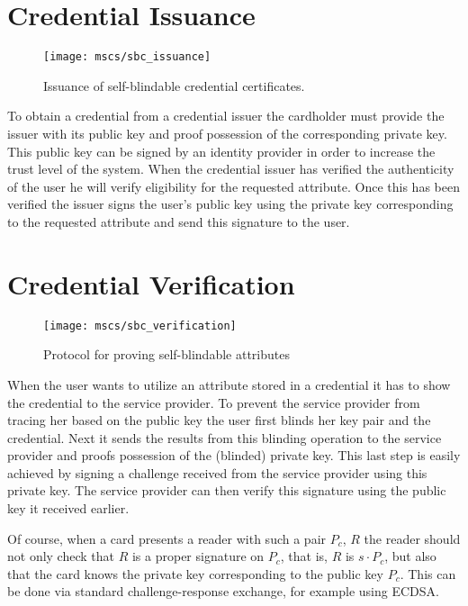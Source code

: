 
\section{Credential Issuance}

\begin{figure}
  \centering
  \texttt{[image: mscs/sbc\_issuance]}
  \caption{Issuance of self-blindable credential certificates.}\label{fig:SBC-issuance}
\end{figure}

To obtain a credential from a credential issuer the cardholder must provide the
issuer with its public key and proof possession of the corresponding private key.
This public key can be signed by an identity provider in order to increase the
trust level of the system. When the credential issuer has verified the
authenticity of the user he will verify eligibility for the requested attribute.
Once this has been verified the issuer signs the user's public key using the
private key corresponding to the requested attribute and send this signature to
the user.

\section{Credential Verification}

\begin{figure}
  \centering
  \texttt{[image: mscs/sbc\_verification]}
  \caption{Protocol for proving self-blindable attributes}\label{fig:textual_en}
\end{figure}

When the user wants to utilize an attribute stored in a credential it has to
show the credential to the service provider. To prevent the service provider
from tracing her based on the public key the user first blinds her key pair and
the credential. Next it sends the results from this blinding operation to the
service provider and proofs possession of the (blinded) private key. This last
step is easily achieved by signing a challenge received from the service
provider using this private key. The service provider can then verify this
signature using the public key it received earlier.


Of course, when a card presents a reader with such a pair $P_c$, $R$
the reader should not only check that $R$ is a proper signature on
$P_c$, that is, $R$ is $s\cdot P_c$, but also that the card knows the private
key corresponding to the public key $P_c$. This can be done via standard
challenge-response exchange, for example using ECDSA.

